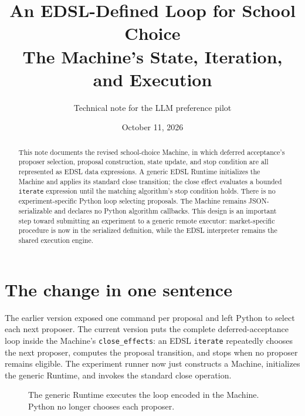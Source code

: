 \documentclass[11pt]{article}
\title{An EDSL-Defined Loop for School Choice\\\large The Machine's State, Iteration, and Execution}
\author{Technical note for the LLM preference pilot}
\date{October 11, 2026}
\begin{document}
\maketitle

\begin{abstract}
This note documents the revised school-choice Machine, in which deferred acceptance's proposer selection, proposal construction, state update, and stop condition are all represented as EDSL data expressions. A generic EDSL Runtime initializes the Machine and applies its standard close transition; the close effect evaluates a bounded \texttt{iterate} expression until the matching algorithm's stop condition holds. There is no experiment-specific Python loop selecting proposals. The Machine remains JSON-serializable and declares no Python algorithm callbacks. This design is an important step toward submitting an experiment to a generic remote executor: market-specific procedure is now in the serialized definition, while the EDSL interpreter remains the shared execution engine.
\end{abstract}

\section{The change in one sentence}
The earlier version exposed one command per proposal and left Python to select each next proposer. The current version puts the complete deferred-acceptance loop inside the Machine's \texttt{close\_effects}: an EDSL \texttt{iterate} repeatedly chooses the next proposer, computes the proposal transition, and stops when no proposer remains eligible. The experiment runner now just constructs a Machine, initializes the generic Runtime, and invokes the standard close operation.

\begin{figure}[h]
\centering
{}
\caption{The generic Runtime executes the loop encoded in the Machine. Python no longer chooses each proposer.}
\end{figure}
\end{document}
